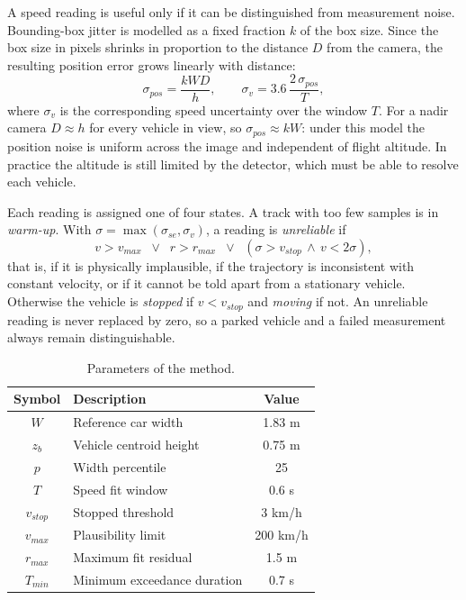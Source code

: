 \documentclass[conference]{IEEEtran}
\begin{document}
A speed reading is useful only if it can be distinguished from measurement noise. Bounding-box jitter is modelled as a fixed fraction $k$ of the box size. Since the box size in pixels shrinks in proportion to the distance $D$ from the camera, the resulting position error grows linearly with distance:
\begin{equation}
\sigma_{pos} = \frac{kWD}{h}, \qquad \sigma_v = 3.6\,\frac{2\,\sigma_{pos}}{T},
\label{eq:noise}
\end{equation}
where $\sigma_v$ is the corresponding speed uncertainty over the window $T$. For a nadir camera $D \approx h$ for every vehicle in view, so $\sigma_{pos} \approx kW$: under this model the position noise is uniform across the image and independent of flight altitude. In practice the altitude is still limited by the detector, which must be able to resolve each vehicle.

Each reading is assigned one of four states. A track with too few samples is in \textit{warm-up}. With $\sigma = \max(\sigma_{se}, \sigma_v)$, a reading is \textit{unreliable} if
\begin{equation}
v > v_{max} \;\;\lor\;\; r > r_{max} \;\;\lor\;\;
\left(\sigma > v_{stop} \,\land\, v < 2\sigma\right),
\label{eq:gate}
\end{equation}
that is, if it is physically implausible, if the trajectory is inconsistent with constant velocity, or if it cannot be told apart from a stationary vehicle. Otherwise the vehicle is \textit{stopped} if $v < v_{stop}$ and \textit{moving} if not. An unreliable reading is never replaced by zero, so a parked vehicle and a failed measurement always remain distinguishable.

\begin{table}[htbp]
\centering
\caption{Parameters of the method.}
\label{tab:params}
\begin{tabular}{|c|l|c|}
\hline
\textbf{Symbol} & \textbf{Description} & \textbf{Value} \\
\hline
$W$ & Reference car width & 1.83 m \\
$z_b$ & Vehicle centroid height & 0.75 m \\
$p$ & Width percentile & 25 \\
$T$ & Speed fit window & 0.6 s \\
$v_{stop}$ & Stopped threshold & 3 km/h \\
$v_{max}$ & Plausibility limit & 200 km/h \\
$r_{max}$ & Maximum fit residual & 1.5 m \\
$T_{min}$ & Minimum exceedance duration & 0.7 s \\
\hline
\end{tabular}
\end{table}
\end{document}

